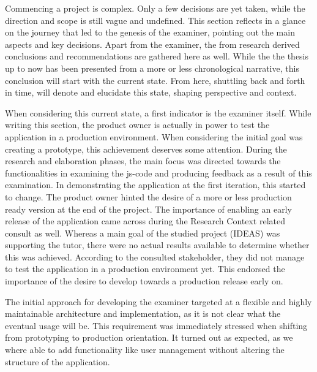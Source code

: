 Commencing a project is complex. Only a few decisions are yet taken, while
the direction and scope is still vague and undefined. This section reflects in a 
glance on the journey that led to the genesis of the \gls{examiner}, pointing 
out the main aspects and key decisions. Apart from the \gls{examiner}, the from 
research derived conclusions and recommendations are gathered here as well. 
While the the thesis up to now has been presented from a more or less chronological
narrative, this conclusion will start with the current state. From
here, shuttling back and forth in time, will denote and elucidate this state,
shaping perspective and context.


When considering this current state, a first indicator is the \gls{examiner}
itself. While writing this section, the product owner is actually in power to
test the application in a production environment. When considering the
initial goal was creating a prototype, this achievement deserves some attention.
During the research and elaboration phases, the main focus was directed towards 
the functionalities in examining the \gls{js-code} and producing \gls{feedback}
as a result of this examination. In demonstrating the application at the
first iteration, this started to change. The product owner hinted the desire of
a more or less production ready version at the end of the project. The 
importance of enabling an early release of the \gls{application} came across
during the Research Context related consult as well. Whereas a main goal of the
studied project (IDEAS) was supporting the \gls{tutor}, there were no actual
results available to determine whether this was achieved. According to the
consulted stakeholder, they did not manage to test the application in a 
production environment yet. This endorsed the importance of the desire to 
develop towards a production release early on.


The initial approach for developing the \gls{examiner} targeted at a flexible
and highly maintainable architecture and implementation, as it is not clear
what the eventual usage will be. This requirement was immediately stressed
when shifting from prototyping to production orientation. It turned out as
expected, as we where able to add functionality like user management without 
altering the structure of the application.


